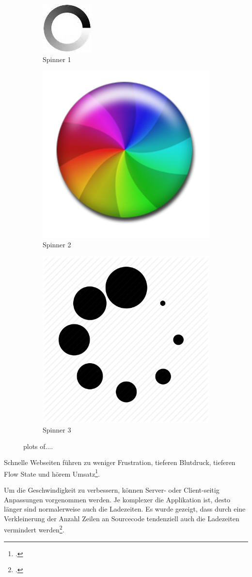 \begin{figure}[H]
	\begin{subfigure}{.3\textwidth}
	  \centering
	  \includegraphics[width=.2\linewidth]{images/spinner1.jpeg}
	  \caption{Spinner 1}
	  \label{fig:requirementsengineerin:nichtfunktionale:geschwindigkeit:spinner:1}
	\end{subfigure}%
	\begin{subfigure}{.3\textwidth}
	 \centering
	 \includegraphics[width=.2\linewidth]{images/spinner2.png}
	 \caption{Spinner 2}
  	 \label{fig:requirementsengineerin:nichtfunktionale:geschwindigkeit:spinner:2}
	\end{subfigure}
	\begin{subfigure}{.3\textwidth}
	\centering
	\includegraphics[width=.2\linewidth]{images/spinner3.png}
	\caption{Spinner 3}
 	 \label{fig:requirementsengineerin:nichtfunktionale:geschwindigkeit:spinner:2}
	\end{subfigure}
	\caption{plots of....}
	  \label{fig:requirementsengineerin:nichtfunktionale:geschwindigkeit:spinner}
\end{figure}

Schnelle Webseiten führen zu weniger Frustration, tieferen Blutdruck, tieferen Flow State und hörem Umsatz\footcite{The_Psychology_of_Web_Performance_-_how_slow_response_times_affect_user_psychology_2015-06-01}.

Um die Geschwindigkeit zu verbessern, können Server- oder Client-seitig Anpassungen vorgenommen werden. Je komplexer die Applikation ist, desto länger sind normalerweise auch die Ladezeiten. Es wurde gezeigt, dass durch eine Verkleinerung der Anzahl Zeilen an Sourcecode tendenziell auch die Ladezeiten vermindert werden\footcite{Web_Page_Performance_Thesis_-_web_page_response_time_measurement_modeling_and_monitoring_2015-06-01}.


